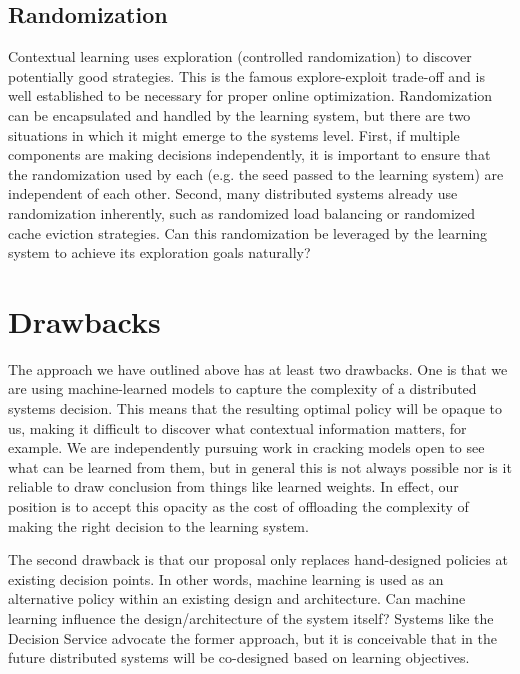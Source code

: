 \documentclass[a4paper,twocolumn]{article}
\newcommand{\ignore}[1]{}
\begin{document}
\subsection*{Randomization}

Contextual learning uses exploration (controlled randomization) to discover
potentially good strategies. This is the famous explore-exploit trade-off and is
well established to be necessary for proper online optimization. Randomization
can be encapsulated and handled by the learning system, but there are two
situations in which it might emerge to the systems level. First, if multiple
components are making decisions independently, it is important to ensure that
the randomization used by each (e.g. the seed passed to the learning system)
are independent of each other. Second, many distributed systems already use
randomization inherently, such as randomized load balancing or randomized cache
eviction strategies. Can this randomization be leveraged by the learning
system to achieve its exploration goals naturally?

\ignore{
An ML agent can be trained offline with pre-labeled data. However, is this
possible in the context of distributed systems? An online learning systems is
more logical in this context, however, how do we quantify the costs of
exploration vs exploitation of learned strategies?
}

\section{Drawbacks}

The approach we have outlined above has at least two drawbacks. One is that we
are using machine-learned models to capture the complexity of a distributed
systems decision. This means that the resulting optimal policy will be opaque to
us, making it difficult to discover what contextual information matters, for
example.  We are independently pursuing work in cracking models open to see what
can be learned from them, but in general this is not always possible nor is it
reliable to draw conclusion from things like learned weights. In effect, our
position is to accept this opacity as the cost of offloading the complexity of
making the right decision to the learning system.

The second drawback is that our proposal only replaces hand-designed policies at
existing decision points. In other words, machine learning is used as an
alternative policy within an existing design and architecture. Can machine
learning influence the design/architecture of the system itself? Systems like
the Decision Service advocate the former approach, but it is conceivable that in
the future distributed systems will be co-designed based on learning objectives.
\end{document}
